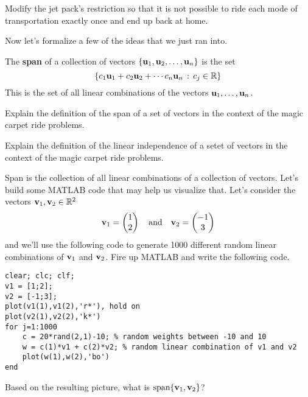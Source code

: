 \begin{problem}
    Modify the jet pack's restriction so that it is not possible to ride each mode of
    transportation exactly once and end up back at home.
\end{problem}

Now let's formalize a few of the ideas that we just ran into.
\begin{definition}
    The {\bf span} of a collection of vectors $\{{\bf u}_1,{\bf u}_2,\ldots,{\bf u}_n\}$ is the set \[
    \{ c_1 {\bf u}_1 + c_2 {\bf u}_2 + \cdots c_n {\bf u}_n \, : \, c_j \in \mathbb{R} \} \] This is
    the set of all linear combinations of the vectors ${\bf u}_1, \ldots, {\bf u}_n$.
\end{definition}

\begin{problem}
    Explain the definition of the span of a set of vectors in the context of the magic
    carpet ride problems.
\end{problem}

\begin{problem}
    Explain the definition of the linear independence of a setet of vectors in the context
    of the magic carpet ride problems.
\end{problem}

\begin{problem}\label{prob:MATLAB_span}
    Span is the collection of all linear combinations of a collection of vectors.  Let's
    build some MATLAB code that may help us visualize that. Let's consider the vectors
    ${\bf v}_1, {\bf v}_2 \in \mathbb{R}^2$
    \[ {\bf v}_1 = \begin{pmatrix} 1 \\ 2 \end{pmatrix} \quad \text{and} \quad {\bf v}_2 =
            \begin{pmatrix} -1 \\ 3 \end{pmatrix} \]
    and we'll use the following code to generate 1000 different random linear combinations
    of ${\bf v}_1$ and ${\bf v}_2$.  Fire up MATLAB and write the following code.
\begin{lstlisting}
clear; clc; clf;
v1 = [1;2];
v2 = [-1;3];
plot(v1(1),v1(2),'r*'), hold on
plot(v2(1),v2(2),'k*')
for j=1:1000
    c = 20*rand(2,1)-10; % random weights between -10 and 10
    w = c(1)*v1 + c(2)*v2; % random linear combination of v1 and v2
    plot(w(1),w(2),'bo')
end
\end{lstlisting}
Based on the resulting picture, what is $\text{span}\{{\bf v}_1,{\bf v}_2\}$?
\end{problem}

